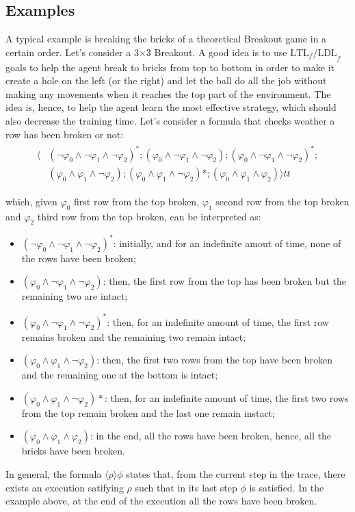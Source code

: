 \subsection{Examples}
A typical example is breaking the bricks of a theoretical Breakout game in a
certain order. Let's consider a 3$\times$3 Breakout. A good idea is to use
$\text{LTL}_f\text{/LDL}_f$ goals to help the agent break to bricks from top
to bottom in order to make it create a hole on the left (or the right) and let
the ball do all the job without making any movements when it reaches the top
part of the environment. The idea is, hence, to help the agent learn
the most effective strategy, which should also decrease the training time.
Let's consider a formula that checks weather a row has been broken or not:
\begin{align}
\begin{split}
    \langle&(\neg\varphi_0 \land \neg\varphi_1 \land \neg\varphi_2)^*;
        (\varphi_0 \land \neg\varphi_1 \land \neg\varphi_2);
        (\varphi_0 \land \neg\varphi_1 \land \neg\varphi_2)^*;\\
        &(\varphi_0 \land \varphi_1 \land \neg\varphi_2);
        (\varphi_0 \land \varphi_1 \land \neg\varphi_2)*;
        (\varphi_0 \land \varphi_1 \land \varphi_2)\rangle tt
\end{split}
\end{align}

\noindent which, given $\varphi_0$ first row from the top broken,
$\varphi_1$ second row from the top broken and $\varphi_2$ third row from the
top broken, can be interpreted as:
\begin{itemize}
    \item $(\neg\varphi_0 \land \neg\varphi_1 \land \neg\varphi_2)^*$:
        initially, and for an indefinite amout of time, none of the rows have
        been broken;
    \item $(\varphi_0 \land \neg\varphi_1 \land \neg\varphi_2)$: then,
        the first row from the top has been broken but the remaining two
        are intact;
    \item $(\varphi_0 \land \neg\varphi_1 \land \neg\varphi_2)^*$: then,
        for an indefinite amount of time, the first row remains broken
        and the remaining two remain intact;
    \item $(\varphi_0 \land \varphi_1 \land \neg\varphi_2)$: then,
        the first two rows from the top have been broken and the remaining
        one at the bottom is intact;
    \item $(\varphi_0 \land \varphi_1 \land \neg\varphi_2)*$: then,
        for an indefinite amount of time, the first two rows from the top
        remain broken and the last one remain instact;
    \item $(\varphi_0 \land \varphi_1 \land \varphi_2)$: in the end,
        all the rows have been broken, hence, all the bricks have been broken.
\end{itemize}

In general, the formula $\langle\rho\rangle\phi$ states that, from the current step in
the trace, there exists an execution satifying $\rho$ such that in its last
step $\phi$ is satisfied. In the example above, at the end of the execution all
the rows have been broken.
